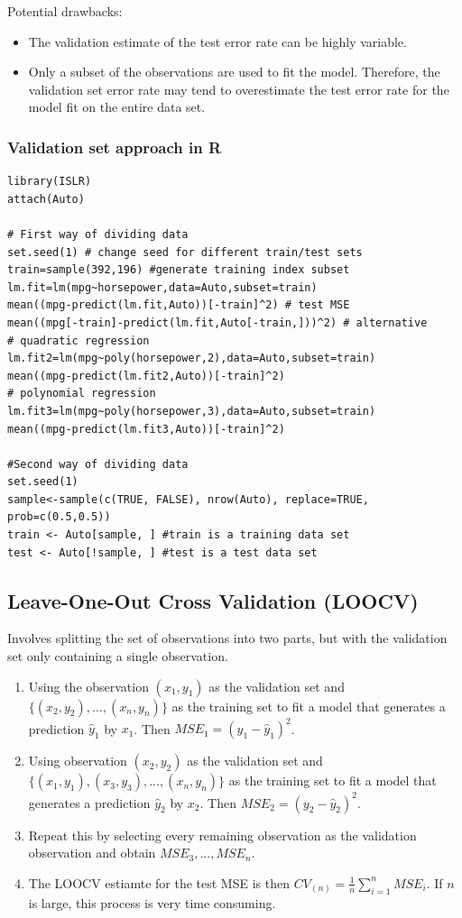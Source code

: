 \documentclass[11pt]{article}
\begin{document}
\noindent Potential drawbacks:
\begin{itemize}
    \item The validation estimate of the test error rate can be highly variable.
    \item Only a subset of the observations are used to fit the model. Therefore, the validation set error rate may tend to overestimate the test error rate for the model fit on the entire data set.
\end{itemize}

\subsubsection{Validation set approach in R}
\begin{lstlisting}
library(ISLR)
attach(Auto)

# First way of dividing data
set.seed(1) # change seed for different train/test sets
train=sample(392,196) #generate training index subset
lm.fit=lm(mpg~horsepower,data=Auto,subset=train)
mean((mpg-predict(lm.fit,Auto))[-train]^2) # test MSE 
mean((mpg[-train]-predict(lm.fit,Auto[-train,]))^2) # alternative
# quadratic regression
lm.fit2=lm(mpg~poly(horsepower,2),data=Auto,subset=train)
mean((mpg-predict(lm.fit2,Auto))[-train]^2)
# polynomial regression
lm.fit3=lm(mpg~poly(horsepower,3),data=Auto,subset=train)
mean((mpg-predict(lm.fit3,Auto))[-train]^2)

#Second way of dividing data
set.seed(1)
sample<-sample(c(TRUE, FALSE), nrow(Auto), replace=TRUE, prob=c(0.5,0.5))
train <- Auto[sample, ] #train is a training data set
test <- Auto[!sample, ] #test is a test data set
\end{lstlisting}

\subsection{Leave-One-Out Cross Validation (LOOCV)}
\noindent Involves splitting the set of observations into two parts, but with the validation set only containing a single observation. \\

\begin{enumerate}
    \item Using the observation $(x_1, y_1)$ as the validation set and $\{ (x_2,y_2),...,(x_n,y_n) \}$ as the training set to fit a model that generates a prediction $\hat y_1$ by $x_1$. Then $MSE_1 = (y_1 - \hat y_1)^2$.
    \item Using observation $(x_2,y_2)$ as the validation set and $\{ (x_1,y_1),(x_3,y_3),...,(x_n,y_n) \}$ as the training set to fit a model that generates a prediction $\hat y_2$ by $x_2$. Then $MSE_2 = (y_2 - \hat y_2)^2$.
    \item Repeat this by selecting every remaining observation as the validation observation and obtain $MSE_3,...,MSE_n$.
    \item The LOOCV estiamte for the test MSE is then $CV_{(n)} = \frac{1}{n}\sum_{i=1}^{n}{MSE_i}$. If $n$ is large, this process is very time consuming.
\end{enumerate} \phantom{i}
\end{document}
